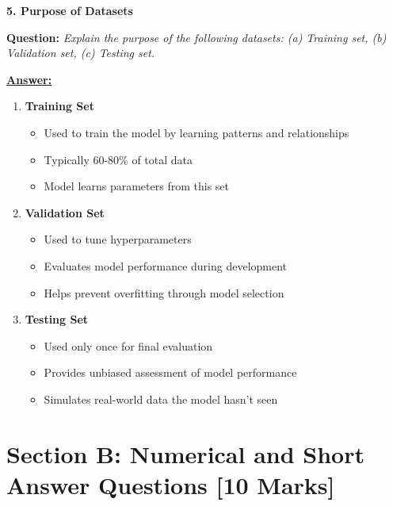 \documentclass[11pt,a4paper]{article}
\newcommand{\questiontitle}[2]{%
    \vspace{0.4cm}%
    \noindent\textbf{\large\color{headerblue}#1. #2}\par\vspace{0.15cm}%
}
\newcommand{\qprompt}[1]{%
    \noindent\textbf{Question:} \textit{#1}\par\vspace{0.2cm}%
}
\newcommand{\answer}{\noindent\textbf{\underline{Answer:}}\par\vspace{0.15cm}}
\begin{document}
\questiontitle{5}{Purpose of Datasets}
\qprompt{Explain the purpose of the following datasets: (a) Training set, (b) Validation set, (c) Testing set.}
\answer
\begin{enumerate}[label=\textbf{(\alph*)}]
    \item \textbf{Training Set}
    \begin{itemize}
        \item Used to train the model by learning patterns and relationships
        \item Typically 60-80\% of total data
        \item Model learns parameters from this set
    \end{itemize}

    \item \textbf{Validation Set}
    \begin{itemize}
        \item Used to tune hyperparameters
        \item Evaluates model performance during development
        \item Helps prevent overfitting through model selection
    \end{itemize}

    \item \textbf{Testing Set}
    \begin{itemize}
        \item Used only once for final evaluation
        \item Provides unbiased assessment of model performance
        \item Simulates real-world data the model hasn't seen
    \end{itemize}
\end{enumerate}

\vspace{0.5cm}

\section*{Section B: Numerical and Short Answer Questions \hfill [10 Marks]}
\end{document}
